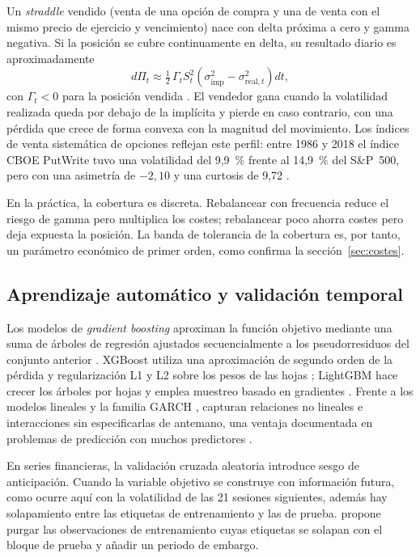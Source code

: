 \documentclass[11pt,a4paper]{article}
\begin{document}
Un \textit{straddle} vendido (venta de una opción de compra y una de venta con el mismo precio de ejercicio y vencimiento) nace con delta próxima a cero y gamma negativa. Si la posición se cubre continuamente en delta, su resultado diario es aproximadamente
\begin{equation}\label{eq:gamma}
  d\Pi_t \approx \tfrac{1}{2}\,\Gamma_t S_t^2\left(\sigma^2_{\text{imp}}-\sigma^2_{\text{real},t}\right)dt,
\end{equation}
con $\Gamma_t<0$ para la posición vendida \citep{sinclair2008}. El vendedor gana cuando la volatilidad realizada queda por debajo de la implícita y pierde en caso contrario, con una pérdida que crece de forma convexa con la magnitud del movimiento. Los índices de venta sistemática de opciones reflejan este perfil: entre 1986 y 2018 el índice CBOE PutWrite tuvo una volatilidad del 9,9~\% frente al 14,9~\% del S\&P~500, pero con una asimetría de $-2{,}10$ y una curtosis de 9,72 \citep{wilshire2019}.

En la práctica, la cobertura es discreta. Rebalancear con frecuencia reduce el riesgo de gamma pero multiplica los costes; rebalancear poco ahorra costes pero deja expuesta la posición. La banda de tolerancia de la cobertura es, por tanto, un parámetro económico de primer orden, como confirma la sección~\ref{sec:costes}.

\subsection{Aprendizaje automático y validación temporal}

Los modelos de \textit{gradient boosting} aproximan la función objetivo mediante una suma de árboles de regresión ajustados secuencialmente a los pseudorresiduos del conjunto anterior \citep{friedman2001}. XGBoost utiliza una aproximación de segundo orden de la pérdida y regularización L1 y L2 sobre los pesos de las hojas \citep{chen2016}; LightGBM hace crecer los árboles por hojas y emplea muestreo basado en gradientes \citep{ke2017}. Frente a los modelos lineales y la familia GARCH \citep{bollerslev1986}, capturan relaciones no lineales e interacciones sin especificarlas de antemano, una ventaja documentada en problemas de predicción con muchos predictores \citep{medeiros2021}.

En series financieras, la validación cruzada aleatoria introduce sesgo de anticipación. Cuando la variable objetivo se construye con información futura, como ocurre aquí con la volatilidad de las 21 sesiones siguientes, además hay solapamiento entre las etiquetas de entrenamiento y las de prueba. \citet{lopezdeprado2018} propone purgar las observaciones de entrenamiento cuyas etiquetas se solapan con el bloque de prueba y añadir un periodo de embargo.
\end{document}
